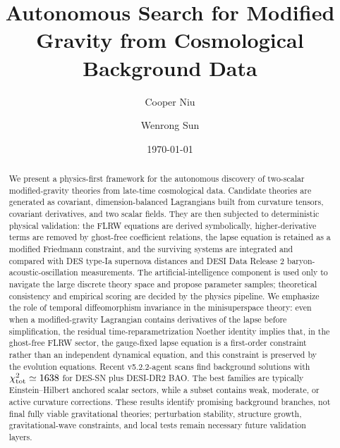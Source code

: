 \documentclass[aps,prd,twocolumn,superscriptaddress,nofootinbib,longbibliography]{revtex4-2}
\newcommand{\chiT}{\chi^2_{\rm tot}}
\begin{document}

\title{Autonomous Search for Modified Gravity from Cosmological Background Data}

\author{Cooper Niu}

\author{Wenrong Sun}

\date{\today}

\begin{abstract}
We present a physics-first framework for the autonomous discovery of two-scalar modified-gravity theories from late-time cosmological data.  Candidate theories are generated as covariant, dimension-balanced Lagrangians built from curvature tensors, covariant derivatives, and two scalar fields.  They are then subjected to deterministic physical validation: the FLRW equations are derived symbolically, higher-derivative terms are removed by ghost-free coefficient relations, the lapse equation is retained as a modified Friedmann constraint, and the surviving systems are integrated and compared with DES type-Ia supernova distances and DESI Data Release 2 baryon-acoustic-oscillation measurements.  The artificial-intelligence component is used only to navigate the large discrete theory space and propose parameter samples; theoretical consistency and empirical scoring are decided by the physics pipeline.  We emphasize the role of temporal diffeomorphism invariance in the minisuperspace theory: even when a modified-gravity Lagrangian contains derivatives of the lapse before simplification, the residual time-reparametrization Noether identity implies that, in the ghost-free FLRW sector, the gauge-fixed lapse equation is a first-order constraint rather than an independent dynamical equation, and this constraint is preserved by the evolution equations.  Recent v5.2.2-agent scans find background solutions with $\chiT\simeq 1638$ for DES-SN plus DESI-DR2 BAO.  The best families are typically Einstein--Hilbert anchored scalar sectors, while a subset contains weak, moderate, or active curvature corrections.  These results identify promising background branches, not final fully viable gravitational theories; perturbation stability, structure growth, gravitational-wave constraints, and local tests remain necessary future validation layers.
\end{abstract}

\maketitle
\end{document}
